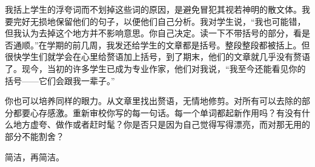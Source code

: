 我括上学生的浮夸词而不划掉这些词的原因，是避免冒犯其视若神明的散文体。我要完好无损地保留他们的句子，以便他们自己分析。我对学生说，“我也可能错，但我认为去掉这个地方并不影响意思。你自己决定。读一下不带括号的部分，看是否通顺。”在学期的前几周，我发还给学生的文章都是括号。整段整段都被括上。但很快学生们就学会在心里给赘语加上括号，到了期末，他们的文章就几乎没有赘语了。现今，当初的许多学生已成为专业作家，他们对我说，“我至今还能看见你的括号——它们会跟我一辈子。”

你也可以培养同样的眼力。从文章里找出赘语，无情地修剪。对所有可以去除的部分都要心存感激。重新审校你写的每一句话。每一个单词都起新作用吗？有没有什么地方虚夸、做作或者赶时髦？你是否只是因为自己觉得写得漂亮，而对那无用的部分不能割舍？

简洁，再简洁。